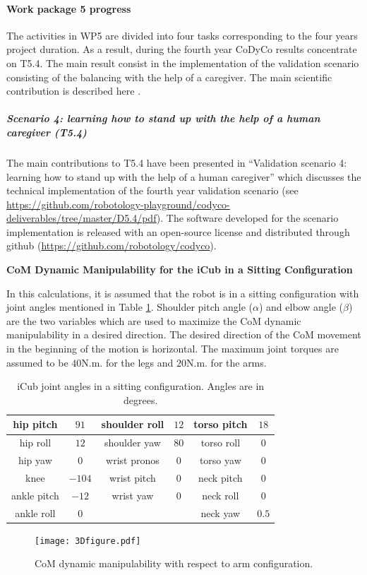 
\paragraph{Work package 5 progress}

The activities in WP5 are divided into four tasks corresponding to the four years project duration. As a result, during the fourth year CoDyCo results concentrate on T5.4. The main result consist in the implementation of the validation scenario consisting of the balancing with the help of a caregiver. The main scientific contribution is described here \cite{latella2016whole}.

\subparagraph{Scenario 4: learning how to stand up with the help of a human caregiver (T5.4)}

The main contributions to T5.4 have been presented in ``Validation scenario 4: learning how to stand up with the help of a human caregiver'' which discusses the technical implementation of the fourth year validation scenario (see \url{https://github.com/robotology-playground/codyco-deliverables/tree/master/D5.4/pdf}). The software developed for the scenario implementation is released with an open-source license and distributed through github (\url{https://github.com/robotology/codyco}).


\textbf{CoM Dynamic Manipulability for the iCub in a Sitting Configuration}


In this calculations, it is assumed that the robot is in a sitting
configuration with joint angles mentioned in Table \ref{jointangles}.
Shoulder pitch angle ($\alpha$) and elbow angle ($\beta$) are the two
variables which are used to maximize the CoM dynamic manipulability in a
desired direction.  The desired direction of the CoM movement in the beginning
of the motion is horizontal.  The maximum joint torques are assumed to be
$40$N.m. for the legs and $20$N.m. for the arms.
%
\begin{table} 
  \centering
  \caption{iCub joint angles in a sitting configuration.  Angles are in
    degrees.}
  \begin{tabular}{|c|c||c|c||c|c|}
    \hline hip pitch   & $91$   & shoulder roll & $12$ & torso pitch & $18$ \\
    \hline hip roll    & $12$   & shoulder yaw  & $80$ & torso roll  & $0$   \\
    \hline hip yaw     & $0$    & wrist pronos  & $0$  & torso yaw   & $0$   \\
    \hline knee        & $-104$ & wrist pitch   & $0$  & neck pitch  & $0$ \\
    \hline ankle pitch & $-12$  & wrist yaw     & $0$  & neck roll   & $0$ \\
    \hline ankle roll  & $0$    &               &      & neck yaw    & $0.5$ \\
    \hline
  \end{tabular}
  \label{jointangles}
\end{table}
%
\begin{figure}
  \centering
  \texttt{[image: 3Dfigure.pdf]}
  \caption{CoM dynamic manipulability with respect to arm configuration.}
  \label{3Dfig}
\end{figure}
%

